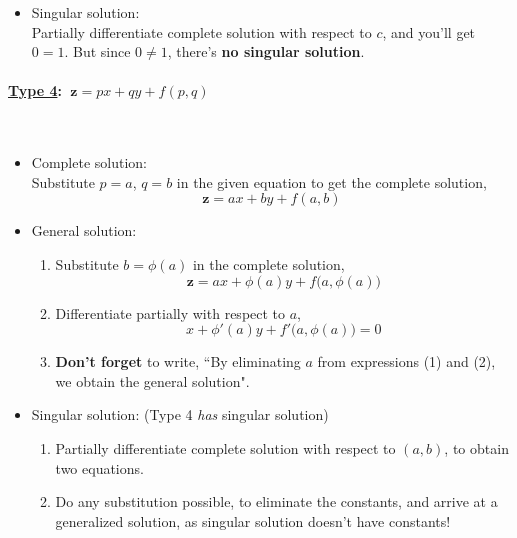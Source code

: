 \documentclass{article}
\newcommand{\para}[1]{\paragraph{#1}\mbox{}\\}
\begin{document}
{\begin{itemize}
\begin{enumerate}[1)]
\item \textbf{Don't forget} to write, ``By eliminating {\LARGE $a$} from expressions (1) and (2), we obtain the general solution".
\end{enumerate}
$\ $
\item Singular solution: \\
Partially differentiate complete solution with respect to {\LARGE $c$}, and you'll get {\LARGE $0=1$}. But since {\LARGE $0\neq 1$}, there's \textbf{no singular solution}.
\end{itemize}
\para{{\Large \underline{Type 4}: {\LARGE $\ \textbf{z}=px+qy+f(p,q)$}}}
\begin{itemize}
\item Complete solution: \\
Substitute {\LARGE $p=a$}, {\LARGE $q=b$} in the given equation to get the complete solution, {\LARGE $$\textbf{z}=ax+by+f(a,b)$$}
\newpage
\item General solution:
\begin{enumerate}[1)]
\item Substitute {\LARGE $b=\phi(a)$} in the complete solution, {\LARGE $$\textbf{z}=ax+\phi(a)y+f\big(a,\phi(a)\big)$$}
\item Differentiate partially with respect to $a$, {\LARGE $$x+\phi'(a)y+f'\big(a,\phi(a)\big)=0$$}
\item \textbf{Don't forget} to write, ``By eliminating {\LARGE $a$} from expressions (1) and (2), we obtain the general solution".
\end{enumerate}
\item Singular solution: (Type 4 \textit{has} singular solution)
\begin{enumerate}[1)]
\item Partially differentiate complete solution with respect to {\LARGE $(a,b)$}, to obtain two equations.
\item Do any substitution possible, to eliminate the constants, and arrive at a generalized solution, as singular solution doesn't have constants!
\end{enumerate}
\end{itemize}
}
\end{document}
